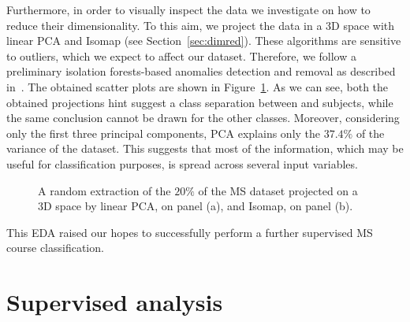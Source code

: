 Furthermore, in order to visually inspect the data we investigate on how to reduce their dimensionality. To this aim, we project the data in a 3D space with linear PCA and Isomap (see Section~\ref{sec:dimred}).
These algorithms are sensitive to outliers, which we expect to affect our dataset. Therefore, we follow a preliminary isolation forests-based anomalies detection and removal as described in~\cite{liu2008isolation, liu2012isolation}.
The obtained scatter plots are shown in Figure~\ref{fig:ms_3dscatterplot}.
As we can see, both the obtained projections hint suggest a class separation between \RR and \SP subjects, while the same conclusion cannot be drawn for the other classes. Moreover, considering only the first three principal components, PCA explains only the $37.4\%$ of the variance of the dataset. This suggests that most of the information, which may be useful for classification purposes, is spread across several input variables.

\begin{figure}[h!]
	\centering
	\hfill
	\caption{A random extraction of the $20\%$ of the MS dataset projected on a 3D space by linear PCA, on panel (a), and Isomap, on panel (b).} \label{fig:ms_3dscatterplot}
\end{figure}

This EDA raised our hopes to successfully perform a further supervised MS course classification.



\section{Supervised analysis}\label{sec:problem_description}


